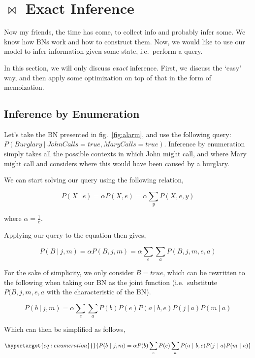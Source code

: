 \documentclass[
]{book}
\begin{document}
\hypertarget{bowtie-exact-inference}{%
\section{\texorpdfstring{\(\bowtie\) Exact
Inference}{\textbackslash bowtie Exact Inference}}\label{bowtie-exact-inference}}

Now my friends, the time has come, to collect info and probably infer
some. We know how BNs work and how to construct them. Now, we would like
to use our model to infer information given some state, i.e.~perform a
query.

In this section, we will only discuss \emph{exact} inference. First, we
discuss the `easy' way, and then apply some optimization on top of that
in the form of memoization.

\hypertarget{inference-by-enumeration}{%
\subsection{Inference by Enumeration}\label{inference-by-enumeration}}

Let's take the BN presented in fig.~\ref{fig:alarm}, and use the
following query: \(P(Burglary\ |\ JohnCalls = true, MaryCalls = true)\).
Inference by enumeration simply takes all the possible contexts in which
John might call, and where Mary might call and considers where this
would have been caused by a burglary.

We can start solving our query using the following relation,

\[
P(X\ |\ e) = \alpha P(X, e) = \alpha \sum_y P(X, e, y)
\]

where \(\alpha=\frac{1}{e}\).

Applying our query to the equation then gives,

\[
P(B\ |\ j, m) = \alpha P(B, j, m) = \alpha \sum_e \sum_a P(B, j, m, e, a)
\]

For the sake of simplicity, we only consider \(B=true\), which can be
rewritten to the following when taking our BN as the joint function
(i.e.~substitute \(P(B, j, m, e, a\) with the characteristic of the BN).

\[
P(b\ |\ j, m) = \alpha \sum_e \sum_a P(b)P(e)P(a\ |\ b,e)P(j\ |\ a)P(m\ |\ a)
\]

Which can then be simplified as follows,

\begin{equation}\protect\hypertarget{eq:enumeration}{}{
P(b\ |\ j, m) = \alpha P(b) \sum_e P(e) \sum_a P(a\ |\ b,e)P(j\ |\ a)P(m\ |\ a)
}\label{eq:enumeration}\end{equation}
\end{document}
